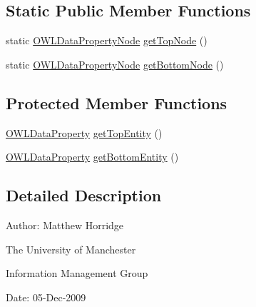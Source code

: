 \subsection*{Static Public Member Functions}
\begin{DoxyCompactItemize}
\item 
static \hyperlink{classorg_1_1semanticweb_1_1owlapi_1_1reasoner_1_1impl_1_1_o_w_l_data_property_node}{O\-W\-L\-Data\-Property\-Node} \hyperlink{classorg_1_1semanticweb_1_1owlapi_1_1reasoner_1_1impl_1_1_o_w_l_data_property_node_a3f72697ee6b670214cd5fbc266f27e75}{get\-Top\-Node} ()
\item 
static \hyperlink{classorg_1_1semanticweb_1_1owlapi_1_1reasoner_1_1impl_1_1_o_w_l_data_property_node}{O\-W\-L\-Data\-Property\-Node} \hyperlink{classorg_1_1semanticweb_1_1owlapi_1_1reasoner_1_1impl_1_1_o_w_l_data_property_node_ab18336bf720d926c06b680f73b774613}{get\-Bottom\-Node} ()
\end{DoxyCompactItemize}
\subsection*{Protected Member Functions}
\begin{DoxyCompactItemize}
\item 
\hyperlink{interfaceorg_1_1semanticweb_1_1owlapi_1_1model_1_1_o_w_l_data_property}{O\-W\-L\-Data\-Property} \hyperlink{classorg_1_1semanticweb_1_1owlapi_1_1reasoner_1_1impl_1_1_o_w_l_data_property_node_a0e1117beccfc9f9fe40c76b379d59071}{get\-Top\-Entity} ()
\item 
\hyperlink{interfaceorg_1_1semanticweb_1_1owlapi_1_1model_1_1_o_w_l_data_property}{O\-W\-L\-Data\-Property} \hyperlink{classorg_1_1semanticweb_1_1owlapi_1_1reasoner_1_1impl_1_1_o_w_l_data_property_node_a6725d120c8be1b93d6f522028f2fb35d}{get\-Bottom\-Entity} ()
\end{DoxyCompactItemize}


\subsection{Detailed Description}
Author\-: Matthew Horridge\par
 The University of Manchester\par
 Information Management Group\par
 Date\-: 05-\/\-Dec-\/2009 

